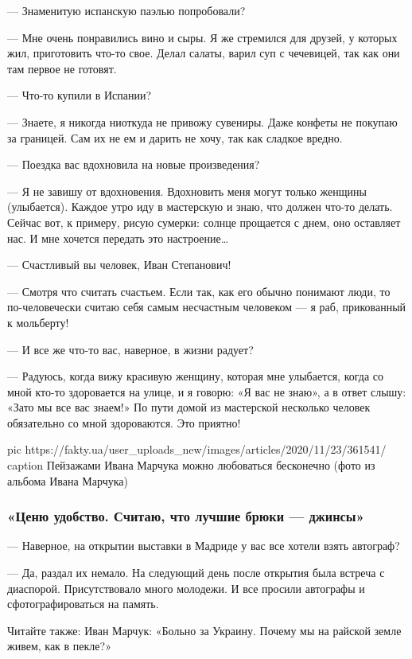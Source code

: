 — Знаменитую испанскую паэлью попробовали?

— Мне очень понравились вино и сыры. Я же стремился для друзей, у которых
жил, приготовить что-то свое. Делал салаты, варил суп с чечевицей, так как
они там первое не готовят.

— Что-то купили в Испании?

— Знаете, я никогда ниоткуда не привожу сувениры. Даже конфеты не покупаю
за границей. Сам их не ем и дарить не хочу, так как сладкое вредно.

— Поездка вас вдохновила на новые произведения?

— Я не завишу от вдохновения. Вдохновить меня могут только женщины
(улыбается). Каждое утро иду в мастерскую и знаю, что должен что-то
делать. Сейчас вот, к примеру, рисую сумерки: солнце прощается с днем, оно
оставляет нас. И мне хочется передать это настроение…

— Счастливый вы человек, Иван Степанович!

— Смотря что считать счастьем. Если так, как его обычно понимают люди,
то по-человечески считаю себя самым несчастным человеком — я раб,
прикованный к мольберту!

— И все же что-то вас, наверное, в жизни радует?

— Радуюсь, когда вижу красивую женщину, которая мне улыбается, когда
со мной кто-то здоровается на улице, и я говорю: «Я вас не знаю»,
а в ответ слышу: «Зато мы все вас знаем!» По пути домой из мастерской
несколько человек обязательно со мной здороваются. Это приятно!

\ifcmt
pic https://fakty.ua/user_uploads_new/images/articles/2020/11/23/361541/%
caption Пейзажами Ивана Марчука можно любоваться бесконечно (фото из альбома Ивана Марчука)
\fi


\subsubsection{«Ценю удобство. Считаю, что лучшие брюки — джинсы»}

— Наверное, на открытии выставки в Мадриде у вас все хотели взять
автограф?

— Да, раздал их немало. На следующий день после открытия была встреча
с диаспорой. Присутствовало много молодежи. И все просили автографы
и сфотографироваться на память.

Читайте также: Иван Марчук: «Больно за Украину. Почему мы на райской
земле живем, как в пекле?»

